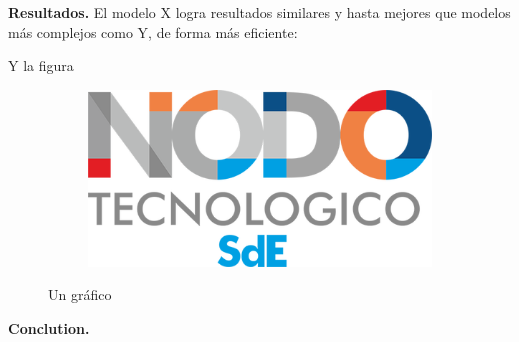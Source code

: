 \documentclass[a0,portrait]{a0poster} %
\begin{document}
\begin{multicols}{2}
\vspace{0.5cm}

\textbf{Resultados.} El modelo X logra resultados similares y hasta mejores que modelos más complejos como Y, de forma más eficiente:
\vspace{0.3cm}
\begin{table}[H] \centering
\normalsize
{}
\end{table}

Y la figura

\vspace{1cm}
\begin{figure}[H]
\centering
\begin{subfigure}[b]{1\linewidth}
    \centering
    \includegraphics[width=.4\linewidth]{figuras/NODOSdE.png}
\end{subfigure}
\caption{Un gráfico}
\end{figure}

\lipsum[5]


\vspace{1cm}
\textbf{Conclution.}
\lipsum[5]


\vspace{1cm}
{ \small
\nocite{*} %
}


\end{multicols}
\end{document}
